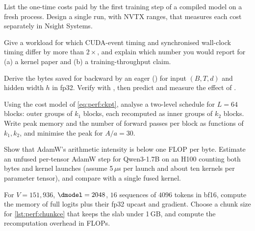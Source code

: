 \begin{exercise}
List the one-time costs paid by the first training step of a compiled model on a fresh process.
Design a single run, with NVTX ranges, that measures each cost separately in Nsight Systems.
\end{exercise}

\begin{exercise}
Give a workload for which CUDA-event timing and synchronised wall-clock timing differ by more than
$2\times$, and explain which number you would report for (a) a kernel paper and (b) a training-throughput
claim.
\end{exercise}

\begin{exercise}
Derive the bytes saved for backward by an eager  () for
input $(B,T,d)$ and hidden width $h$ in fp32. Verify with , then predict
and measure the effect of .
\end{exercise}

\begin{exercise}\label{ex:perf:twolevel}
Using the cost model of \cref{eq:perf:ckpt}, analyse a two-level schedule for $L=64$ blocks: outer
groups of $k_1$ blocks, each recomputed as inner groups of $k_2$ blocks. Write peak memory and the
number of forward passes per block as functions of $k_1,k_2$, and minimise the peak for $A/a=30$.
\end{exercise}

\begin{exercise}
Show that AdamW's arithmetic intensity is below one FLOP per byte. Estimate an unfused per-tensor
AdamW step for Qwen3-1.7B on an H100 counting both bytes and kernel launches (assume 5\,$\mu$s per
launch and about ten kernels per parameter tensor), and compare with a single fused kernel.
\end{exercise}

\begin{exercise}
For $V=151{,}936$, $\dmodel=2048$, $16$ sequences of $4096$ tokens in bf16, compute the memory of
full logits plus their fp32 upcast and gradient. Choose a chunk size for \cref{lst:perf:chunkce}
that keeps the slab under 1\,GB, and compute the recomputation overhead in FLOPs.
\end{exercise}

